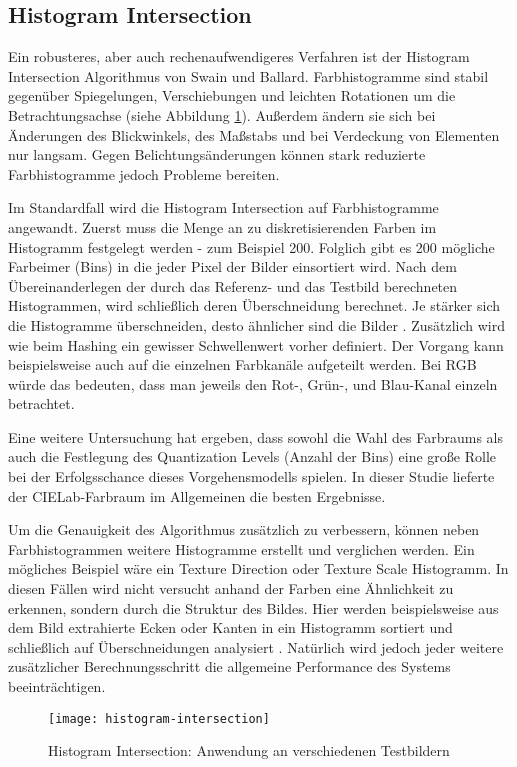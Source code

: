 \subsection{Histogram Intersection}
Ein robusteres, aber auch rechenaufwendigeres Verfahren ist der Histogram
Intersection Algorithmus von Swain und Ballard. Farbhistogramme sind stabil
gegenüber Spiegelungen, Verschiebungen und leichten Rotationen um die
Betrachtungsachse (siehe Abbildung \ref{fig:hintersection}). Außerdem ändern sie
sich bei Änderungen des Blickwinkels, des Maßstabs und bei Verdeckung von
Elementen nur langsam. Gegen Belichtungsänderungen können stark reduzierte
Farbhistogramme jedoch Probleme bereiten. \parencite{histogram-swain-ballard}

Im Standardfall wird die Histogram Intersection auf Farbhistogramme angewandt. 
Zuerst muss die Menge an zu diskretisierenden Farben im Histogramm festgelegt
werden - zum Beispiel 200. Folglich gibt es 200 mögliche \glqq{}Farbeimer\grqq{}
(Bins) in die jeder Pixel der Bilder einsortiert wird. Nach dem
Übereinanderlegen der durch das Referenz- und das Testbild berechneten
Histogrammen, wird schließlich deren Überschneidung berechnet. Je stärker sich
die Histogramme überschneiden, desto ähnlicher sind die Bilder
\parencite{histogram-image-similarity}. Zusätzlich wird wie beim Hashing ein
gewisser Schwellenwert vorher definiert. Der Vorgang kann beispielsweise auch
auf die einzelnen Farbkanäle aufgeteilt werden. Bei RGB würde das bedeuten, dass
man jeweils den Rot-, Grün-, und Blau-Kanal einzeln betrachtet.
\parencite{histogram-swain-ballard}

Eine weitere Untersuchung hat ergeben, dass sowohl die Wahl des Farbraums als
auch die Festlegung des Quantization Levels (Anzahl der Bins) eine große Rolle
bei der Erfolgsschance dieses Vorgehensmodells spielen. In dieser Studie
lieferte der CIELab-Farbraum im Allgemeinen die besten Ergebnisse.
\parencite{histogram-image-similarity}

Um die Genauigkeit des Algorithmus zusätzlich zu verbessern, können neben
Farbhistogrammen weitere Histogramme erstellt und verglichen werden. Ein
mögliches Beispiel wäre ein \glqq{}Texture Direction\grqq{} oder
\glqq{}Texture Scale\grqq{} Histogramm. In diesen Fällen wird nicht versucht
anhand der Farben eine Ähnlichkeit zu erkennen, sondern durch die Struktur des
Bildes. Hier werden beispielsweise aus dem Bild extrahierte Ecken oder Kanten in
ein Histogramm sortiert und schließlich auf Überschneidungen analysiert
\parencite{histogram-stackoverflow}. Natürlich wird jedoch jeder weitere
zusätzlicher Berechnungsschritt die allgemeine Performance des Systems
beeinträchtigen.

\begin{figure}[H]
    \centering
    \texttt{[image: histogram-intersection]}
    \caption{Histogram Intersection: Anwendung an verschiedenen Testbildern}
    \label{fig:hintersection}
\end{figure}
